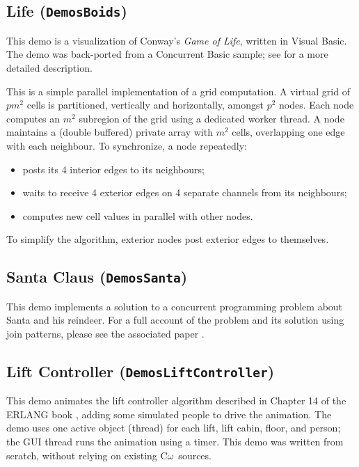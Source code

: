 \documentclass{article}
\newcommand{\comega}{\texorpdfstring{\mbox{C$\omega$}}{C{omega}}}
\newcommand{\demo}[1]{\texorpdfstring{{(\texttt{Demos{\symbol{92}}#1})}}{}}
\begin{document}
\subsection{Life \demo{Boids}}

This demo is a visualization of Conway's \emph{Game of Life}, written in Visual Basic. The demo was 
back-ported from a Concurrent Basic sample; see \cite{oopsla08cb} for a more detailed description.

This is a simple parallel implementation of a grid computation.
A virtual grid of $pm^2$ cells is partitioned, vertically and horizontally, amongst $p^2$ nodes.
Each node computes an $m^2$ subregion of the grid using a dedicated worker thread.
A node maintains a (double buffered) private array with $m^2$ cells, overlapping one edge with each neighbour.
To synchronize, a node repeatedly:  
\begin{itemize}
\item posts its 4 interior edges to its neighbours;
\item waits to receive 4 exterior edges on 4 separate channels from its   neighbours;
\item computes new cell values in parallel with other nodes.
\end{itemize}
To simplify the algorithm, exterior nodes post exterior edges to themselves.

\subsection{Santa Claus \demo{Santa}}
This demo implements a solution to a concurrent programming problem
about Santa and his reindeer. For a full account of the problem and
its solution using join patterns, please see the associated paper \cite{benton:santa}.

\subsection{Lift Controller \demo{LiftController}}

This demo animates the lift controller algorithm described in Chapter
14 of the ERLANG book \cite{erlang}, adding some simulated people
to drive the animation.  The demo uses one active object (thread) for each lift,
lift cabin, floor, and person; the GUI thread runs the animation using a timer. 
This demo was written from scratch, without relying on existing \comega\ sources.






\end{document}
